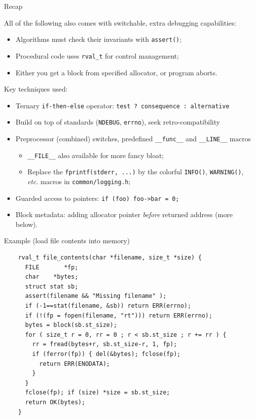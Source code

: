 \begin{frame}[fragile]{Recap}

  All of the following also comes with switchable, extra debugging capabilities:
  \begin{itemize}
  \item Algorithms must check their invariants with \lstinline{assert()};
  \item Procedural code uses \lstinline{rval_t} for control management;
  \item Either you get a block from specified allocator, or program aborts.
  \end{itemize}

  Key techniques used:
  \begin{itemize}
  \item Ternary \lstinline{if-then-else} operator: \lstinline{test ? consequence : alternative}
  \item Build on top of standards (\lstinline{NDEBUG}, \lstinline{errno}), seek retro-compatibility
  \item Preprocessor (combined) switches, predefined \lstinline{__func__} and  \lstinline{__LINE__} macros
    \begin{itemize}
    \item \lstinline{__FILE__} also available for more fancy bloat;
    \item Replace the \lstinline{fprintf(stderr, ...)} by the colorful \lstinline{INFO()}, \lstinline{WARNING()}, {\em etc.} macros in \lstinline{common/logging.h};
    \end{itemize}
  \item Guarded access to pointers: \lstinline{if (foo) foo->bar = 0;}
  \item Block metadata: adding allocator pointer {\em before} returned address (more below).
  \end{itemize}
  
\end{frame}


\begin{frame}[fragile]{Example (load file contents into memory)}

  \begin{lstlisting}
    rval_t file_contents(char *filename, size_t *size) {
      FILE       *fp;
      char    *bytes;
      struct stat sb;
      assert(filename && "Missing filename" );
      if (-1==stat(filename, &sb)) return ERR(errno);
      if (!(fp = fopen(filename, "rt"))) return ERR(errno);
      bytes = block(sb.st_size);
      for ( size_t r = 0, rr = 0 ; r < sb.st_size ; r += rr ) {
        rr = fread(bytes+r, sb.st_size-r, 1, fp);
        if (ferror(fp)) { del(&bytes); fclose(fp);
          return ERR(ENODATA);
        }
      }
      fclose(fp); if (size) *size = sb.st_size;
      return OK(bytes);
    }
  \end{lstlisting}
  
\end{frame}


